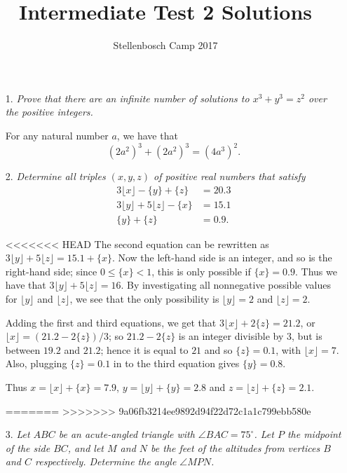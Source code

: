 \documentclass[12pt]{article}
\title{Intermediate Test 2 Solutions}
\author{Stellenbosch Camp 2017}
\begin{document}
 \maketitle

\begin{enumerate}


\item[1.] \emph{Prove that there are an infinite number of solutions to $x^3 + y^3 = z^2$ over the positive integers.}

For any natural number $a$, we have that
\[
    (2a^2)^3 + (2a^2)^3 = (4a^3)^2.
\]


\item[2.] \emph{Determine all triples $(x,y,z)$ of positive real numbers that satisfy
\begin{align*}
	3\lfloor{x}\rfloor -\{y\} +\{z\} &= 20.3 \\
	3\lfloor{y}\rfloor +5\lfloor{z}\rfloor -\{x\} &= 15.1 \\
	\{y\} +\{z\} &= 0.9.
\end{align*}
}

<<<<<<< HEAD
The second equation can be rewritten as $3\lfloor{y}\rfloor +5\lfloor{z}\rfloor = 15.1 +\{x\}$. Now the left-hand side is an integer, and so is the right-hand side; since $0 \leq \{x\} < 1$, this is only possible if $\{x\} = 0.9$. Thus we have that $3\lfloor{y}\rfloor +5\lfloor{z}\rfloor = 16$. By investigating all nonnegative possible values for $\lfloor{y}\rfloor$ and $\lfloor{z}\rfloor$, we see that the only possibility is $\lfloor{y}\rfloor = 2$ and $\lfloor{z}\rfloor = 2$.

Adding the first and third equations, we get that $3\lfloor{x}\rfloor +2\{z\} = 21.2$, or $\lfloor{x}\rfloor = (21.2-2\{z\})/3$; so $21.2-2\{z\}$ is an integer divisible by 3, but is between $19.2$ and $21.2$; hence it is equal to $21$ and so $\{z\} = 0.1$, with $\lfloor{x}\rfloor = 7$. Also, plugging $\{z\} = 0.1$ in to the third equation gives $\{y\} = 0.8$.

Thus $x = \lfloor{x}\rfloor +\{x\} = 7.9$, $y = \lfloor{y}\rfloor +\{y\} = 2.8$ and $z = \lfloor{z}\rfloor +\{z\} = 2.1$.


=======
>>>>>>> 9a06fb3214ee9892d94f22d72c1a1c799ebb580e
\item[3.] \emph{Let $ABC$ be an acute-angled triangle with $\angle BAC = 75^\circ$. Let $P$ the midpoint of the side $BC$, and let $M$ and $N$ be the feet of the altitudes from vertices $B$ and $C$ respectively. Determine the angle $\angle MPN$.}


\end{enumerate}
\end{document}
